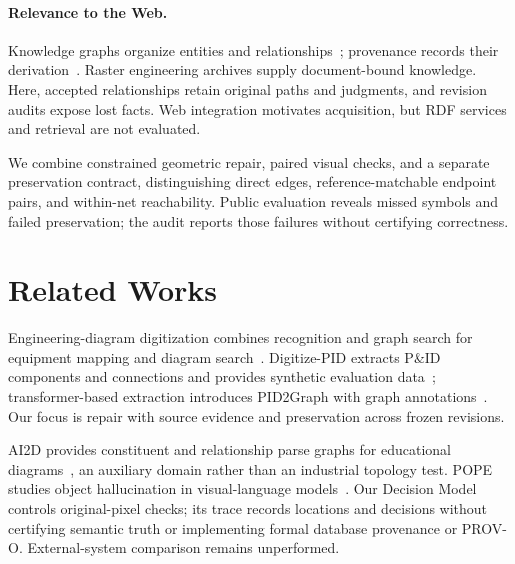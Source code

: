 \documentclass[sigconf,review]{acmart}
\begin{document}
\paragraph{Relevance to the Web.}
Knowledge graphs organize entities and relationships~\cite{hogan2021knowledge}; provenance records their derivation~\cite{buneman2001provenance,lebo2013provo}. Raster engineering archives supply document-bound knowledge. Here, accepted relationships retain original paths and judgments, and revision audits expose lost facts. Web integration motivates acquisition, but RDF services and retrieval are not evaluated.

We combine constrained geometric repair, paired visual checks, and a separate preservation contract, distinguishing direct edges, reference-matchable endpoint pairs, and within-net reachability. Public evaluation reveals missed symbols and failed preservation; the audit reports those failures without certifying correctness.

\section{Related Works}
Engineering-diagram digitization combines recognition and graph search for equipment mapping and diagram search~\cite{mani2020digitization}. Digitize-PID extracts P\&ID components and connections and provides synthetic evaluation data~\cite{paliwal2021digitize}; transformer-based extraction introduces PID2Graph with graph annotations~\cite{sturmer2025pid2graph}. Our focus is repair with source evidence and preservation across frozen revisions.

AI2D provides constituent and relationship parse graphs for educational diagrams~\cite{kembhavi2016diagram}, an auxiliary domain rather than an industrial topology test. POPE studies object hallucination in visual-language models~\cite{li2023pope}. Our Decision Model controls original-pixel checks; its trace records locations and decisions without certifying semantic truth or implementing formal database provenance or PROV-O. External-system comparison remains unperformed.
\end{document}
